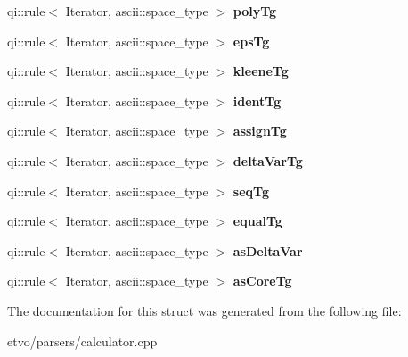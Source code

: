 \begin{DoxyCompactItemize}
\mbox{\label{structcalculator_etvo_1_1calculator_a20fb97055e0f86045fd0e8fd6df1bfb9}} 
qi\+::rule$<$ Iterator, ascii\+::space\+\_\+type $>$ {\bfseries poly\+Tg}
\item 
\mbox{\label{structcalculator_etvo_1_1calculator_a23bd743a243f2f5af1ac12f1e5cc6dcc}} 
qi\+::rule$<$ Iterator, ascii\+::space\+\_\+type $>$ {\bfseries eps\+Tg}
\item 
\mbox{\label{structcalculator_etvo_1_1calculator_af39c11f4c9ea1f78752c9a89953d13c3}} 
qi\+::rule$<$ Iterator, ascii\+::space\+\_\+type $>$ {\bfseries kleene\+Tg}
\item 
\mbox{\label{structcalculator_etvo_1_1calculator_a71a58b97998a33c024ce250d7055779e}} 
qi\+::rule$<$ Iterator, ascii\+::space\+\_\+type $>$ {\bfseries ident\+Tg}
\item 
\mbox{\label{structcalculator_etvo_1_1calculator_a05a6608a64eed7eca37f3cf267c1e813}} 
qi\+::rule$<$ Iterator, ascii\+::space\+\_\+type $>$ {\bfseries assign\+Tg}
\item 
\mbox{\label{structcalculator_etvo_1_1calculator_acf4d6c84c7130e2bf64b9f650452d625}} 
qi\+::rule$<$ Iterator, ascii\+::space\+\_\+type $>$ {\bfseries delta\+Var\+Tg}
\item 
\mbox{\label{structcalculator_etvo_1_1calculator_afe6e95609570c818f6b05b9123ef9998}} 
qi\+::rule$<$ Iterator, ascii\+::space\+\_\+type $>$ {\bfseries seq\+Tg}
\item 
\mbox{\label{structcalculator_etvo_1_1calculator_acb6c729d98372ba07bc1c99ffc4c3d38}} 
qi\+::rule$<$ Iterator, ascii\+::space\+\_\+type $>$ {\bfseries equal\+Tg}
\item 
\mbox{\label{structcalculator_etvo_1_1calculator_abf09a1c1c233449b083ec03aa05e3a72}} 
qi\+::rule$<$ Iterator, ascii\+::space\+\_\+type $>$ {\bfseries as\+Delta\+Var}
\item 
\mbox{\label{structcalculator_etvo_1_1calculator_a211157350e38a3d60b7a247214e9e3bc}} 
qi\+::rule$<$ Iterator, ascii\+::space\+\_\+type $>$ {\bfseries as\+Core\+Tg}
\end{DoxyCompactItemize}


The documentation for this struct was generated from the following file\+:\begin{DoxyCompactItemize}
\item 
etvo/parsers/calculator.\+cpp\end{DoxyCompactItemize}
